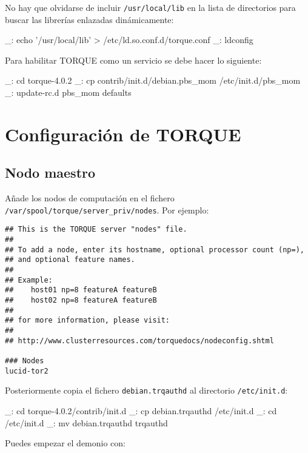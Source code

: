 No hay que olvidarse de incluir \texttt{/usr/local/lib} en la lista de directorios para buscar las librerías enlazadas dinámicamente:

\begin{bashcode}
_: echo '/usr/local/lib' > /etc/ld.so.conf.d/torque.conf
_: ldconfig
\end{bashcode}

Para habilitar TORQUE como un servicio se debe hacer lo siguiente:

\begin{bashcode}
_: cd torque-4.0.2
_: cp contrib/init.d/debian.pbs_mom /etc/init.d/pbs_mom
_: update-rc.d pbs_mom defaults
\end{bashcode}


\section{Configuración de TORQUE}


\subsection{Nodo maestro}
\label{anx:torque-conf-maestro}

Añade los nodos de computación en el fichero \texttt{/var/spool/torque/server\_priv/nodes}. Por ejemplo:

\begin{lstlisting}
## This is the TORQUE server "nodes" file. 
## 
## To add a node, enter its hostname, optional processor count (np=), 
## and optional feature names.
## 
## Example:
##    host01 np=8 featureA featureB 
##    host02 np=8 featureA featureB
## 
## for more information, please visit:
## 
## http://www.clusterresources.com/torquedocs/nodeconfig.shtml

### Nodes
lucid-tor2
\end{lstlisting}

Posteriormente copia el fichero \texttt{debian.trqauthd} al directorio \texttt{/etc/init.d}:

\begin{bashcode}
_: cd torque-4.0.2/contrib/init.d
_: cp debian.trqauthd /etc/init.d
_: cd /etc/init.d
_: mv debian.trqauthd trqauthd
\end{bashcode}

Puedes empezar el demonio con:

